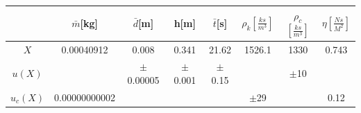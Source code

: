 \documentclass{article}
\begin{document}
\begin{tabular}{|c|c|c|c|c|c|c|c|}
    \hline
    \cellcolor{cyan!50}&\cellcolor{cyan!50}$\bar{m}$[kg]&\cellcolor{cyan!50}$\bar{d}$[m]&\cellcolor{cyan!50}h[m]&\cellcolor{cyan!50}$\bar{t}$[s]&\cellcolor{cyan!50}$\rho_{k}\left[\frac{ks}{m^{3}}\right]$&\cellcolor{cyan!50}$\rho_{c}$$\left[\frac{ks}{m^{3}}\right]$&\cellcolor{cyan!50}$\eta\left[\frac{Ns}{M^{2}}\right]$\\
    \hline 
    \cellcolor{cyan!50}$X$ &\cellcolor{cyan!50}0.00040912&\cellcolor{cyan!50}0.008&\cellcolor{cyan!50}0.341&\cellcolor{cyan!50}21.62&\cellcolor{cyan!50}1526.1&\cellcolor{cyan!50}1330&\cellcolor{cyan!50}0.743\\\hline
    \cellcolor{cyan!50}$u(X)$&\cellcolor{gray}&\cellcolor{cyan!50}$\pm$0.00005&\cellcolor{cyan!50}$\pm$0.001&\cellcolor{cyan!50}$\pm$0.15&\cellcolor{gray}&\cellcolor{cyan!50}$\pm$10&\cellcolor{gray}\\\hline
    \cellcolor{cyan!50}$u_{c}(X)$&\cellcolor{cyan!50}0.00000000002&\cellcolor{gray}&\cellcolor{gray}&\cellcolor{gray}&\cellcolor{cyan!50}$\pm$29&\cellcolor{gray}&\cellcolor{cyan!50}0.12\\\hline
\end{tabular}
\end{document}
